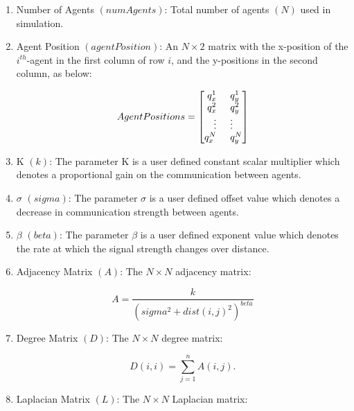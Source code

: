 \documentclass[../CourseManual.tex]{subfiles}
\begin{document}
\renewcommand{\labelenumi}{\roman{enumi}}
\begin{enumerate}

    \item Number of Agents $(numAgents)$: Total number of agents $(N)$ used in simulation.
  
    \item Agent Position $(agentPosition)$: An $N \times 2$ matrix with the x-position of the $i^{th}$-agent in the first column of row $i$, and the y-positions in the second column, as below:
  
    $$Agent Positions = 
    \begin{bmatrix}
    q^{1}_{x} \hspace{0.5cm} q^{1}_{y}\\
    q^{2}_{x} \hspace{0.5cm} q^{2}_{y}\\
    \vdots \hspace{0.5cm} \vdots \\
    q^{N}_{x} \hspace{0.5cm} q^{N}_{y}\\
    \end{bmatrix}$$
  
    \item K $(k)$: The parameter K is a user defined constant scalar multiplier which denotes a proportional gain on the communication between agents.
    
    \item $\sigma$ $(sigma)$: The parameter $\sigma$ is a user defined offset value which denotes a decrease in communication strength between agents.
    
    \item $\beta$ $(beta)$: The parameter $\beta$ is a user defined exponent value which denotes the rate at which the signal strength changes over distance.
    
    \item Adjacency Matrix $(A)$: The $N \times N$ adjacency matrix:
    
    $$A = \dfrac{k}{(sigma^2 + dist(i,j)^2)^{beta}}$$
    
    \item Degree Matrix $(D)$: The $N \times N$ degree matrix:
    
    \[
    D(i,i) = \sum_{j=1}^{n}{A(i,j)}.
    \]
    
    \item Laplacian Matrix $(L)$: The $N \times N$ Laplacian matrix:
    

\end{enumerate}
\end{document}
